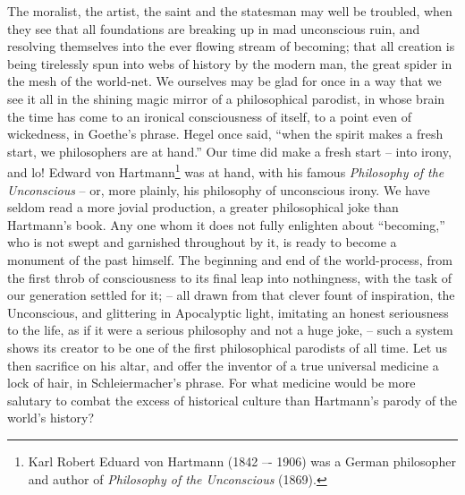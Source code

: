 The moralist, the artist, the saint and the statesman may well be
troubled, when they see that all foundations are breaking up in mad
unconscious ruin, and resolving themselves into the ever flowing
stream of becoming; that all creation is being tirelessly spun into
webs of history by the modern man, the great spider in the mesh of
the world-net. We ourselves may be glad for once in a way that we see
it all in the shining magic mirror of a philosophical parodist, in
whose brain the time has come to an ironical consciousness of itself,
to a point even of wickedness, in Goethe's phrase. Hegel once said,
\enquote{when the spirit makes a fresh start, we philosophers are at hand.}
Our time did make a fresh start -- into irony, and lo! Edward von
Hartmann\footnote{Karl Robert Eduard von Hartmann (1842 –- 1906) was a German philosopher and author of \textit{Philosophy of the Unconscious} (1869).} was at hand, with his famous \textit{Philosophy of the
Unconscious} -- or, more plainly, his philosophy of unconscious irony.
We have seldom read a more jovial production, a greater philosophical
joke than Hartmann's book. Any one whom it does not fully enlighten
about \enquote{becoming,} who is not swept and garnished throughout by it, is
ready to become a monument of the past himself. The beginning and end
of the world-process, from the first throb of consciousness to its
final leap into nothingness, with the task of our generation settled
for it; -- all drawn from that clever fount of inspiration, the
Unconscious, and glittering in Apocalyptic light, imitating an honest
seriousness to the life, as if it were a serious philosophy and not a
huge joke, -- such a system shows its creator to be one of the first
philosophical parodists of all time. Let us then sacrifice on his
altar, and offer the inventor of a true universal medicine a lock of
hair, in Schleiermacher's phrase. For what medicine would be more
salutary to combat the excess of historical culture than Hartmann's
parody of the world's history?

